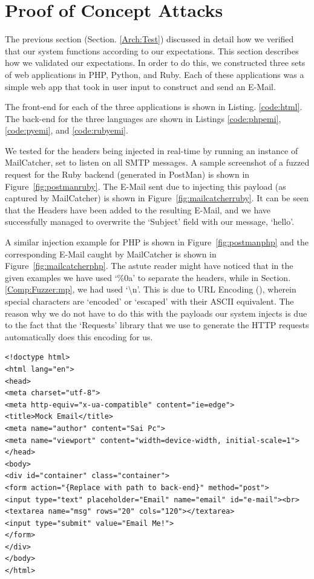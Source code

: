 \section{Proof of Concept Attacks}
The previous section (Section. \ref{Arch:Test}) discussed in detail how we verified that our system functions according to our expectations. This section describes how we validated our expectations. In order to do this, we constructed three sets of web applications in PHP, Python, and Ruby. Each of these applications was a simple web app that took in user input to construct and send an E-Mail.

The front-end for each of the three applications is shown in Listing. \ref{code:html}. The back-end for the three languages are shown in Listings \ref{code:phpemi}, \ref{code:pyemi}, and \ref{code:rubyemi}.

We tested for the headers being injected in real-time by running an instance of MailCatcher, set to listen on all SMTP messages. A sample screenshot of a fuzzed request for the Ruby backend (generated in PostMan) is shown in Figure~\ref{fig:postmanruby}. The E-Mail sent due to injecting this payload (as captured by MailCatcher) is shown in Figure~\ref{fig:mailcatcherruby}. It can be seen that the Headers have been added to the resulting E-Mail, and we have successfully managed to overwrite the `Subject' field with our message, `hello'.

A similar injection example for PHP is shown in Figure~\ref{fig:postmanphp} and the corresponding E-Mail caught by MailCatcher is shown in Figure~\ref{fig:mailcatcherphp}. The astute reader might have noticed that in the given examples we have used `\%0a' to separate the headers, while in Section. \ref{Comp:Fuzzer:mp}, we had used `\textbackslash{}n'. This is due to URL Encoding (\cite{rfc1738}), wherein special characters are `encoded' or `escaped' with their ASCII equivalent.
The reason why we do not have to do this with the payloads our system injects is due to the fact that the `Requests' library that we use to generate the HTTP requests automatically does this encoding for us.

\begin{lstlisting}
<!doctype html>
<html lang="en">
<head>
<meta charset="utf-8">
<meta http-equiv="x-ua-compatible" content="ie=edge">
<title>Mock Email</title>
<meta name="author" content="Sai Pc">
<meta name="viewport" content="width=device-width, initial-scale=1">
</head>
<body>
<div id="container" class="container">
<form action="{Replace with path to back-end}" method="post">
<input type="text" placeholder="Email" name="email" id="e-mail"><br>
<textarea name="msg" rows="20" cols="120"></textarea>
<input type="submit" value="Email Me!">
</form>
</div>
</body>
</html>

\end{lstlisting}

